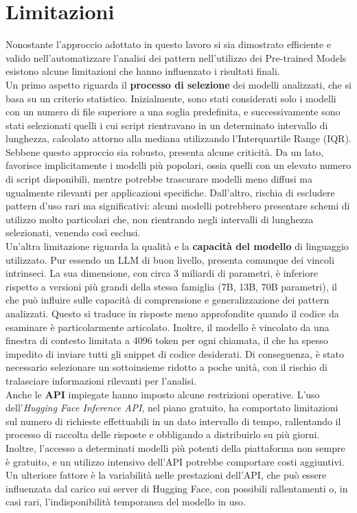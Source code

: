 \documentclass{article}
\begin{document}
\section{Limitazioni}
Nonostante l'approccio adottato in questo lavoro si sia dimostrato efficiente e valido nell'automatizzare l'analisi dei pattern nell'utilizzo dei Pre-trained Models esistono alcune limitazioni che hanno influenzato i risultati finali.\\
Un primo aspetto riguarda il \textbf{processo di selezione} dei modelli analizzati, che si basa su un criterio statistico. Inizialmente, sono stati considerati solo i modelli con un numero di file superiore a una soglia predefinita, e successivamente sono stati selezionati quelli i cui script rientravano in un determinato intervallo di lunghezza, calcolato attorno alla mediana utilizzando l'Interquartile Range (IQR). Sebbene questo approccio sia robusto, presenta alcune criticità. Da un lato, favorisce implicitamente i modelli più popolari, ossia quelli con un elevato numero di script disponibili, mentre potrebbe trascurare modelli meno diffusi ma ugualmente rilevanti per applicazioni specifiche. Dall’altro, rischia di escludere pattern d’uso rari ma significativi: alcuni modelli potrebbero presentare schemi di utilizzo molto particolari che, non rientrando negli intervalli di lunghezza selezionati, venendo così esclusi.\\
Un’altra limitazione riguarda la qualità e la \textbf{capacità del modello} di linguaggio utilizzato. Pur essendo un LLM di buon livello, presenta comunque dei vincoli intrinseci. La sua dimensione, con circa 3 miliardi di parametri, è inferiore rispetto a versioni più grandi della stessa famiglia (7B, 13B, 70B parametri), il che può influire sulle capacità di comprensione e generalizzazione dei pattern analizzati. Questo si traduce in risposte meno approfondite quando il codice da esaminare è particolarmente articolato. Inoltre, il modello è vincolato da una finestra di contesto limitata a 4096 token per ogni chiamata, il che ha spesso impedito di inviare tutti gli snippet di codice desiderati. Di conseguenza, è stato necessario selezionare un sottoinsieme ridotto a poche unità, con il rischio di tralasciare informazioni rilevanti per l’analisi.\\
Anche le \textbf{API} impiegate hanno imposto alcune restrizioni operative. L’uso dell’\textit{Hugging Face Inference API}, nel piano gratuito, ha comportato limitazioni sul numero di richieste effettuabili in un dato intervallo di tempo, rallentando il processo di raccolta delle risposte e obbligando a distribuirlo su più giorni. Inoltre, l’accesso a determinati modelli più potenti della piattaforma non sempre è gratuito, e un utilizzo intensivo dell’API potrebbe comportare costi aggiuntivi. Un ulteriore fattore è la variabilità nelle prestazioni dell’API, che può essere influenzata dal carico sui server di Hugging Face, con possibili rallentamenti o, in casi rari, l’indisponibilità temporanea del modello in uso.\\
\end{document}
